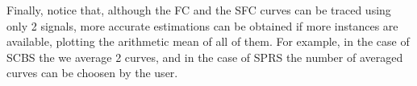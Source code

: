 \documentclass{article}
\begin{document}
Finally, notice that, although the FC and the SFC curves can be traced
using only 2 signals, more accurate estimations can be obtained if
more instances are available, plotting the arithmetic mean of all of
them. For example, in the case of SCBS the we average 2 curves, and in
the case of SPRS the number of averaged curves can be choosen by the
user.

\end{document}
